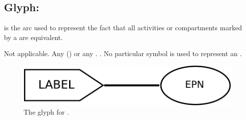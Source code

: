 
\subsection{Glyph:  }\label{sec:equivalenceArc}

 is the arc used to represent the fact that all activities or compartments
marked by a  are equivalent.

\begin{glyphDescription}
 \glyphSboTerm Not applicable.
 \glyphOrigin Any  () or any .
 \glyphTarget {}.
 \glyphEndPoint No particular symbol is used to represent an .
 \end{glyphDescription}

\begin{figure}[H]
  \centering
  \includegraphics[scale = 0.4]{images/equivalence}
  \caption{The \AF glyph for .}
  \label{fig:equivalence}
\end{figure}
